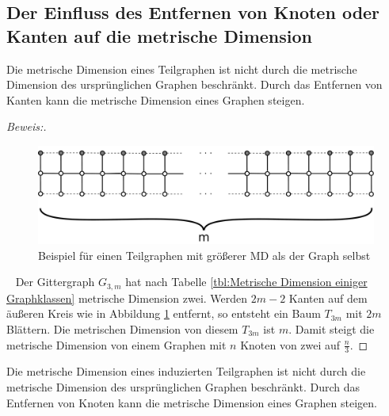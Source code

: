 \subsection{Der Einfluss des Entfernen von Knoten oder Kanten auf die metrische Dimension}
\begin{lem}
Die metrische Dimension eines Teilgraphen ist nicht durch die metrische Dimension des ursprünglichen Graphen beschränkt. Durch das Entfernen von Kanten kann die metrische Dimension eines Graphen steigen.
\end{lem}
\begin{proof}[Beweis:]$\;$
\begin{figure}[h!]
		\centering 		 
\includegraphics[width=420pt]{bilder/gitterzubaum.pdf}
   \caption{Beispiel für einen Teilgraphen mit größerer MD als der Graph selbst}
   \label{bild:Gitterbaum1}
\end{figure}
~ \linebreak
Der Gittergraph $G_{3,m}$ hat nach Tabelle \ref{tbl:Metrische Dimension einiger Graphklassen} metrische Dimension zwei. Werden $2m-2$ Kanten auf dem äußeren Kreis wie in Abbildung \ref{bild:Gitterbaum1} entfernt, so entsteht ein Baum $T_{3m}$ mit $2m$ Blättern. Die metrischen Dimension von diesem $T_{3m}$ ist $m$. Damit steigt die metrische Dimension von einem Graphen mit $n$ Knoten von zwei auf $\frac{n}{3}$.
\end{proof}
\begin{lem}
Die metrische Dimension eines induzierten Teilgraphen ist nicht durch die metrische Dimension des ursprünglichen Graphen beschränkt. Durch das Entfernen von Knoten kann die metrische Dimension eines Graphen steigen.
\end{lem}
